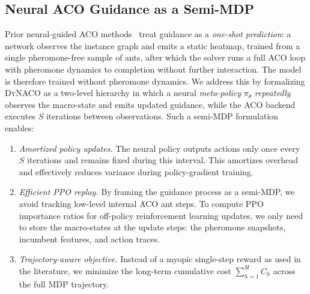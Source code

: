 \documentclass[sigconf]{acmart}
\newcommand{\DyNACO}{\textsc{DyNACO}}
\begin{document}
\subsection{Neural ACO Guidance as a Semi-MDP}
\label{sec:mdp}
Prior neural-guided ACO methods~\cite{deepaco,gfacs,gtgaco} treat guidance as a \emph{one-shot prediction}: a network observes the instance graph and emits a static heatmap, trained from a single pheromone-free sample of ants, after which the solver runs a full ACO loop with pheromone dynamics to completion without further interaction. The model is therefore trained without pheromone dynamics. We address this by formalizing \DyNACO{} as a two-level hierarchy in which a neural \emph{meta-policy} $\pi_\theta$ \emph{repeatedly} observes the macro-state and emits updated guidance, while the ACO backend executes $S$ iterations between observations. Such a semi-MDP formulation enables:

\begin{enumerate}
\item \emph{Amortized policy updates.} The neural policy outputs actions only once every $S$ iterations and remains fixed during this interval. This amortizes overhead and effectively reduces variance during policy-gradient training.
\item \emph{Efficient PPO replay.} By framing the guidance process as a semi-MDP, we avoid tracking low-level internal ACO ant steps. To compute PPO importance ratios for off-policy reinforcement learning updates, we only need to store the macro-states at the update steps: the pheromone snapshots, incumbent features, and action traces.
\item \emph{Trajectory-aware objective.} Instead of a myopic single-step reward as used in the literature, we minimize the long-term cumulative cost $\sum_{h=1}^H C_h$ across the full MDP trajectory.
\end{enumerate}
\end{document}
